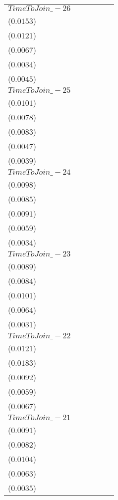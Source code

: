 \begin{tabular}{llllll}
$TimeToJoin\_-26$ &     \makecell{$0.0167^{}$ \\ ($0.0153$)} &     \makecell{$0.0110^{}$ \\ ($0.0121$)} &  \makecell{$-0.0199^{***}$ \\ ($0.0067$)} &  \makecell{$-0.0127^{***}$ \\ ($0.0034$)} &    \makecell{$0.0075^{*}$ \\ ($0.0045$)} \\
$TimeToJoin\_-25$ &     \makecell{$0.0152^{}$ \\ ($0.0101$)} &     \makecell{$0.0093^{}$ \\ ($0.0078$)} &    \makecell{$-0.0158^{*}$ \\ ($0.0083$)} &   \makecell{$-0.0096^{**}$ \\ ($0.0047$)} &    \makecell{$0.0070^{*}$ \\ ($0.0039$)} \\
$TimeToJoin\_-24$ &     \makecell{$0.0087^{}$ \\ ($0.0098$)} &     \makecell{$0.0049^{}$ \\ ($0.0085$)} &     \makecell{$-0.0142^{}$ \\ ($0.0091$)} &     \makecell{$-0.0080^{}$ \\ ($0.0059$)} &    \makecell{$0.0060^{*}$ \\ ($0.0034$)} \\
$TimeToJoin\_-23$ &     \makecell{$0.0038^{}$ \\ ($0.0089$)} &     \makecell{$0.0016^{}$ \\ ($0.0084$)} &     \makecell{$-0.0155^{}$ \\ ($0.0101$)} &     \makecell{$-0.0069^{}$ \\ ($0.0064$)} &     \makecell{$0.0048^{}$ \\ ($0.0031$)} \\
$TimeToJoin\_-22$ &     \makecell{$0.0082^{}$ \\ ($0.0121$)} &     \makecell{$0.0153^{}$ \\ ($0.0183$)} &     \makecell{$-0.0119^{}$ \\ ($0.0092$)} &     \makecell{$-0.0058^{}$ \\ ($0.0059$)} &     \makecell{$0.0099^{}$ \\ ($0.0067$)} \\
$TimeToJoin\_-21$ &    \makecell{$-0.0011^{}$ \\ ($0.0091$)} &    \makecell{$-0.0006^{}$ \\ ($0.0082$)} &     \makecell{$-0.0117^{}$ \\ ($0.0104$)} &     \makecell{$-0.0052^{}$ \\ ($0.0063$)} &     \makecell{$0.0041^{}$ \\ ($0.0035$)} \\

\end{tabular}
